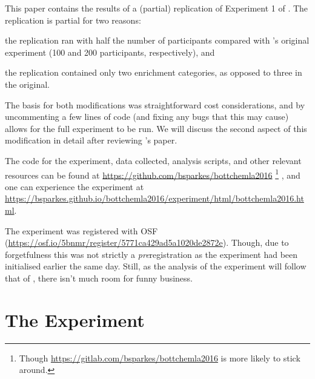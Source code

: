 \documentclass[10pt]{article}
\begin{document}
\begin{multicols}{2}
This paper contains the results of a (partial) replication of Experiment 1 of \textcite{Bott:2016aa}.
The replication is partial for two reasons:
\begin{enumerate*}[label=\arabic*)]
\item the replication ran with half the number of participants compared with \citeauthor{Bott:2016aa}'s original experiment (100 and 200 participants, respectively), and
\item the replication contained only two enrichment categories, as opposed to three in the original.
\end{enumerate*}
The basis for both modifications was straightforward cost considerations, and by uncommenting a few lines of code (and fixing any bugs that this may cause) allows for the full experiment to be run.
We will discuss the second aspect of this modification in detail after reviewing \citeauthor{Bott:2016aa}'s paper.

The code for the experiment, data collected, analysis scripts, and other relevant resources can be found at \url{https://github.com/bsparkes/bottchemla2016}\nolinebreak
\footnote{Though \url{https://gitlab.com/bsparkes/bottchemla2016} is more likely to stick around.}\nolinebreak
, and one can experience the experiment at \url{https://bsparkes.github.io/bottchemla2016/experiment/html/bottchemla2016.html}.

The experiment was registered with OSF (\url{https://osf.io/5bnmr/register/5771ca429ad5a1020de2872e}).
Though, due to forgetfulness this was not strictly a \emph{pre}registration as the experiment had been initialised earlier the same day.
Still, as the analysis of the experiment will follow that of \citeauthor{Bott:2016aa}, there isn't much room for funny business.





\section{The Experiment}
\label{sec:experiment}


\end{multicols}
\end{document}
